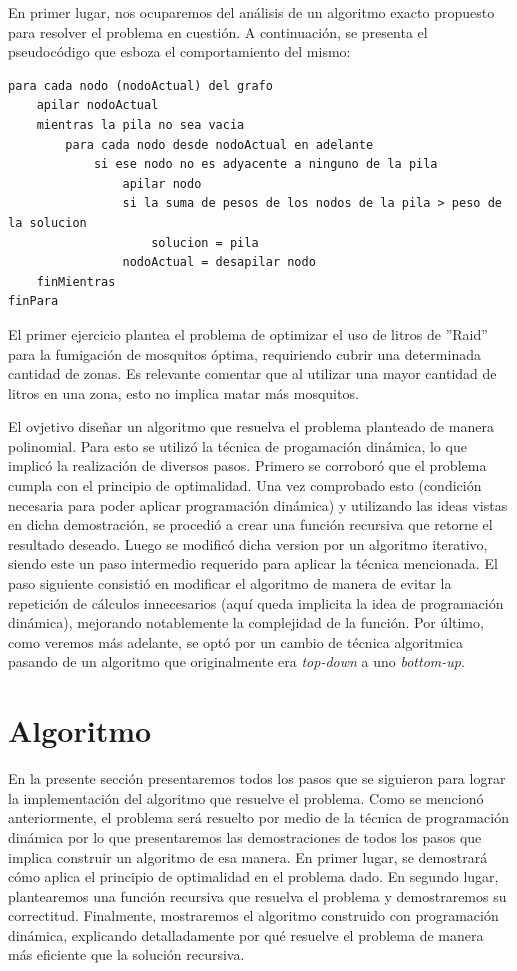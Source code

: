 \documentclass[a4paper,11pt] {article}
\begin{document}
En primer lugar, nos ocuparemos del análisis de un algoritmo exacto propuesto para resolver el problema en cuestión. A continuación, se presenta el pseudocódigo que esboza el comportamiento del mismo:

\begin{verbatim}
para cada nodo (nodoActual) del grafo
    apilar nodoActual
    mientras la pila no sea vacia
        para cada nodo desde nodoActual en adelante
            si ese nodo no es adyacente a ninguno de la pila
                apilar nodo
                si la suma de pesos de los nodos de la pila > peso de la solucion
                    solucion = pila
                nodoActual = desapilar nodo
    finMientras
finPara
\end{verbatim}

El primer ejercicio plantea el problema de optimizar el uso de litros de ''Raid'' para la fumigación de mosquitos óptima, requiriendo cubrir una determinada cantidad de zonas. Es relevante comentar que al utilizar una mayor cantidad de litros en una zona, esto no implica matar más mosquitos.

El ovjetivo diseñar un algoritmo que resuelva el problema planteado de manera polinomial. Para esto se utiliz\'o la t\'ecnica de progamaci\'on din\'amica, lo que implic\'o la realizaci\'on de diversos pasos. Primero se corrobor\'o que el problema cumpla con el principio de optimalidad. Una vez comprobado esto (condici\'on necesaria para poder aplicar programaci\'on din\'amica) y utilizando las ideas vistas en dicha demostraci\'on, se procedi\'o a crear una funci\'on recursiva que retorne el resultado deseado. Luego se modific\'o dicha version por un algoritmo iterativo, siendo este un paso intermedio requerido para aplicar la t\'ecnica mencionada. El paso siguiente consisti\'o en modificar el algoritmo de manera de evitar la repetici\'on de c\'alculos innecesarios (aqu\'i queda implicita la idea de programaci\'on din\'amica), mejorando notablemente la complejidad de la funci\'on. Por \'ultimo, como veremos m\'as adelante, se opt\'o por un cambio de t\'ecnica algoritmica pasando de un algoritmo que originalmente era \textit{top-down} a uno \textit{bottom-up}.

\section*{Algoritmo}

En la presente secci\'on presentaremos todos los pasos que se siguieron para lograr la implementaci\'on del algoritmo que resuelve el problema. Como se mencion\'o anteriormente, el problema ser\'a resuelto por medio de la t\'ecnica de programaci\'on din\'amica por lo que presentaremos las demostraciones de todos los pasos que implica construir un algoritmo de esa manera. En primer lugar, se demostrar\'a c\'omo aplica el principio de optimalidad en el problema dado. En segundo lugar, plantearemos una funci\'on recursiva que resuelva el problema y demostraremos su correctitud. Finalmente, mostraremos el algoritmo construido con programaci\'on din\'amica, explicando detalladamente por qu\'e resuelve el problema de manera m\'as eficiente que la soluci\'on recursiva.
\end{document}
